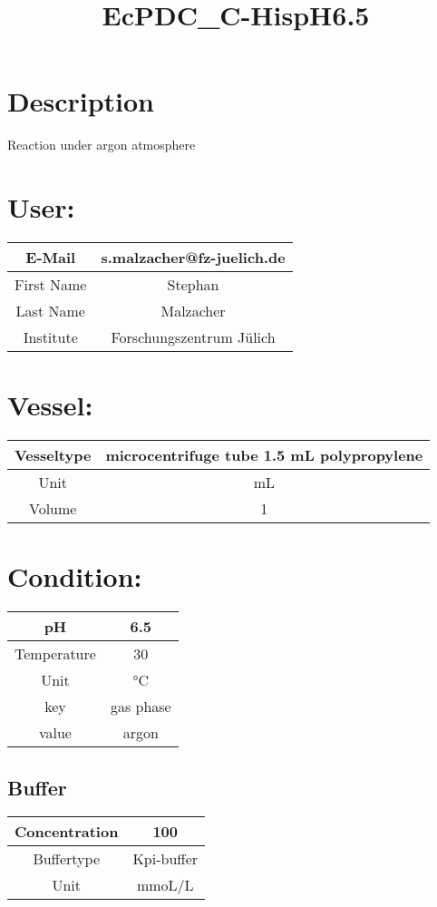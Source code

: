 \documentclass{article}%
\title{EcPDC\_C{-}HispH6.5}%
\begin{document}
%
\normalsize%
\maketitle%
\section{Description}%
\label{sec:Description}%
Reaction under argon atmosphere

%
\section{User:}%
\label{sec:User}%
\begin{tabular}{|c|c|}%
\hline%
E{-}Mail&s.malzacher@fz{-}juelich.de\\%
\hline%
First Name&Stephan\\%
\hline%
Last Name&Malzacher\\%
\hline%
Institute&Forschungszentrum Jülich\\%
\hline%
\end{tabular}

%
\section{Vessel:}%
\label{sec:Vessel}%
\begin{tabular}{|c|c|}%
\hline%
Vesseltype&microcentrifuge tube 1.5 mL polypropylene\\%
\hline%
Unit&mL\\%
\hline%
Volume&1\\%
\hline%
\end{tabular}

%
\section{Condition:}%
\label{sec:Condition}%
\begin{tabular}{|c|c|}%
\hline%
pH&6.5\\%
\hline%
Temperature&30\\%
\hline%
Unit&°C\\%
\hline%
key&gas phase\\%
\hline%
value&argon\\%
\hline%
\end{tabular}

%
\subsection{Buffer}%
\label{subsec:Buffer}%
\begin{tabular}{|c|c|}%
\hline%
Concentration&100\\%
\hline%
Buffertype&Kpi{-}buffer\\%
\hline%
Unit&mmoL/L\\%
\hline%
\end{tabular}
\end{document}
